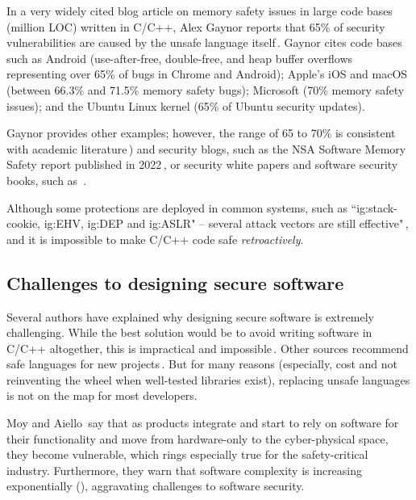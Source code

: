 \documentclass[nomenclature, english, bibtex]{kththesis}
\begin{document}
In a very widely cited blog article on memory safety issues in large code bases (million \gls{LOC}) written in C/C++, Alex Gaynor reports that 65\% of security vulnerabilities are caused by the unsafe language itself\,\cite{gaynor_what_2020}. Gaynor cites code bases such as Android (use-after-free, double-free, and heap buffer overflows representing over 65\% of bugs in Chrome and Android); Apple's iOS and macOS (between 66.3\% and 71.5\% memory safety bugs); Microsoft (70\%  memory safety issues); and the Ubuntu Linux kernel (65\% of Ubuntu security updates).

Gaynor provides other examples; however, the range of 65 to 70\% is consistent with academic literature\,\cite{mergendahl_cross-language_2022,scherer_engineering_2021, li_improving_2014}) and security blogs, such as the \gls{NSA} Software Memory Safety report published in 2022\,\cite{noauthor_nsa_2022}, or security white papers and software security books, such as~\cite{chapman_adacore_2018}.

Although some protections are deployed in common systems, such as ``\gls{ig:stack-cookie}, \gls{ig:EHV}, \gls{ig:DEP} and \gls{ig:ASLR}" -- several attack vectors are still effective"\,\cite{szekeres_sok_2013}, and it is impossible to make C/C++ code safe \emph{retroactively}. 

\subsection{Challenges to designing secure software}

Several authors have explained why designing secure software is extremely challenging. While the best solution would be to avoid writing software in C/C++ altogether, this is impractical and impossible\,\cite{szekeres_sok_2013}. Other sources recommend safe languages for new projects\,\cite{scherer_engineering_2021}. But for many reasons (especially, cost and not reinventing the wheel when well-tested libraries exist), replacing unsafe languages is not on the map for most developers.

Moy and Aiello\,\cite{moy_when_2020} say that as products integrate and start to rely on software for their functionality and move from hardware-only to the cyber-physical space, they become vulnerable, which rings especially true for the \gls{safety-critical} industry. Furthermore, they warn that software complexity is increasing exponentially (\cite{moy_when_2020}), aggravating challenges to software security.
\end{document}
